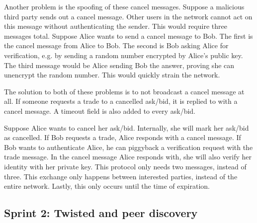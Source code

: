\documentclass[]{article}
\begin{document}
Another problem is the spoofing of these cancel messages.
Suppose a malicious third party sends out a cancel message.
Other users in the network cannot act on this message without authenticating the sender.
This would require three messages total.
Suppose Alice wants to send a cancel message to Bob.
The first is the cancel message from Alice to Bob.
The second is Bob asking Alice for verification, e.g.
by sending a random number encrypted by Alice's public key.
The third message would be Alice sending Bob the answer, proving she can unencrypt the random number.
This would quickly strain the network.


The solution to both of these problems is to not broadcast a cancel message at all.
If someone requests a trade to a cancelled ask/bid, it is replied to with a cancel message.
A timeout field is also added to every ask/bid.


Suppose Alice wants to cancel her ask/bid.
Internally, she will mark her ask/bid as cancelled.
If Bob requests a trade, Alice responds with a cancel message.
If Bob wants to authenticate Alice, he can piggyback a verification request with the trade message.
In the cancel message Alice responds with, she will also verify her identity with her private key.
This protocol only needs two messages, instead of three.
This exchange only happens between interested parties, instead of the entire network.
Lastly, this only occurs until the time of expiration.

\subsection{Sprint 2: Twisted and peer discovery}


\end{document}
